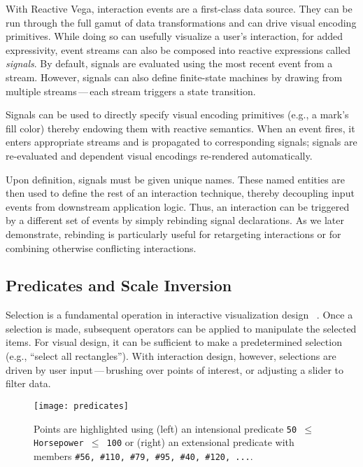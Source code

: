 With Reactive Vega, interaction events are a first-class data source. They can
be run through the full gamut of data transformations and can drive visual
encoding primitives. While doing so can usefully visualize a user's interaction,
for added expressivity, event streams can also be composed into reactive
expressions called \emph{signals}. By default, signals are evaluated using the
most recent event from a stream. However, signals can also define finite-state
machines by drawing from multiple streams\,---\,each stream triggers a state
transition.

Signals can be used to directly specify visual encoding primitives (e.g., a
mark's fill color) thereby endowing them with reactive semantics. When an event
fires, it enters appropriate streams and is propagated to corresponding signals;
signals are re-evaluated and dependent visual encodings re-rendered
automatically.

Upon definition, signals must be given unique names. These named entities are
then used to define the rest of an interaction technique, thereby decoupling
input events from downstream application logic. Thus, an interaction can be
triggered by a different set of events by simply rebinding signal declarations.
As we later demonstrate, rebinding is particularly useful for retargeting
interactions or for combining otherwise conflicting interactions.

\vspace{-10pt}

\subsection{Predicates and Scale Inversion}

\vspace{-10pt}

Selection is a fundamental operation in interactive visualization design~
\cite{heer:generalized}. Once a selection is made, subsequent operators can be
applied to manipulate the selected items. For visual design, it can be
sufficient to make a predetermined selection (e.g., ``select all rectangles'').
With interaction design, however, selections are driven by user
input\,---\,brushing over points of interest, or adjusting a slider to filter
data.

\begin{figure}[b!]
  \centering
  \texttt{[image: predicates]}
  \caption{Points are highlighted using (left) an intensional predicate
  \texttt{50 $\leq$ Horsepower $\leq$ 100} or (right) an extensional predicate
  with members \texttt{\#56, \#110, \#79, \#95, \#40, \#120, ...}.}
  \label{fig:vg:predicates}
\end{figure}

